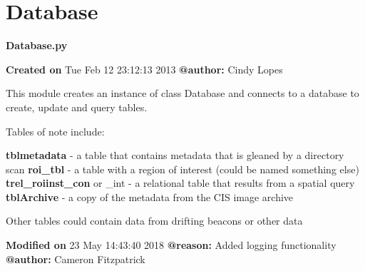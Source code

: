 \documentclass[letterpaper,10pt,openany,oneside]{sphinxmanual}
\begin{document}
\section{Database}
\label{code:database}\label{code:module-Database}
\textbf{Database.py}

\textbf{Created on} Tue Feb 12 23:12:13 2013 \textbf{@author:} Cindy Lopes

This module creates an instance of class Database and connects to a database to
create, update and query tables.

Tables of note include:

\textbf{tblmetadata} - a table that contains metadata that is gleaned by a directory scan
\textbf{roi\_tbl} - a table with a region of interest (could be named something else)
\textbf{trel\_roiinst\_con} or \_int - a relational table that results from a spatial query
\textbf{tblArchive} - a copy of the metadata from the CIS image archive

Other tables could contain data from drifting beacons or other data

\textbf{Modified on} 23 May 14:43:40 2018 \textbf{@reason:} Added logging functionality \textbf{@author:} Cameron Fitzpatrick
\end{document}
